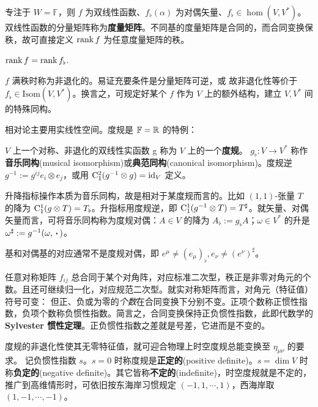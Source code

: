 专注于 $W=\mathbb F$，则 $f$ 为双线性函数、$f_\flat(\alpha)$ 为对偶矢量、$f_\flat\in\hom(V,V^*)$。
双线性函数的分量矩阵称为\textbf{度量矩阵}。不同基的度量矩阵是合同的，而合同变换保秩，故可直接定义 $\rank f$ 为任意度量矩阵的秩。

\begin{theorem}
    $\rank f=\rank f_\flat$.
\end{theorem}

$f$ 满秩时称为非退化的。易证充要条件是分量矩阵可逆，或
故非退化性等价于 $f_\flat\in\mathrm{Isom}(V,V^*)$。换言之，可规定好某个 $f$ 作为 $V$ 上的额外结构，建立 $V,V^*$ 间的特殊同构。

相对论主要用实线性空间。度规是 $\mathbb F=\mathbb{R}$ 的特例：

\begin{definition}
    $V$ 上一个对称、非退化的双线性实函数 g 称为 $V$ 上的一个\textbf{度规}。 $g_\flat:V\to V^*$ 称作\textbf{音乐同构}(musical isomorphism)或\textbf{典范同构}(canonical isomorphism)。度规逆 $g^{-1}:=g^{ij} e_i\otimes e_j$，或用 $\mathrm{C}^2_1(g^{-1}\otimes g)=\mathrm{id}_V$ 定义。
\end{definition}

\begin{definition}
    升降指标操作本质为音乐同构，故是相对于某度规而言的。比如 $(1,1)$-张量 $T$ 的降为
    $\mathrm{C}_1^1(g\otimes T)=T_\flat$。升指标用度规逆，即 $\mathrm{C}_1^1(g^{-1}\otimes T)=T^\sharp$。就矢量、对偶矢量而言，可将音乐同构称为度规对偶：$A\in V$ 的降为 $A_\flat:=g_\flat A$；$\omega\in V^*$ 的升是 $\omega^\sharp:=g^{-1}(\omega,\oo)$。
\end{definition}

\begin{remark}
    基和对偶基的对应通常不是度规对偶，即 $e^\mu\ne (e_\mu)_\flat, e_\nu\ne (e^\nu)^\sharp$。
\end{remark}

任意对称矩阵 $f_{ij}$ 总合同于某个对角阵，对应标准二次型，秩正是非零对角元的个数。且还可继续归一化，对应规范二次型。就实对称矩阵而言，对角元（特征值）符号可变：
但正、负或为零的\textit{个数}在合同变换下分别不变。正项个数称正惯性指数，负项个数称负惯性指数。简言之，合同变换保持正负惯性指数，此即代数学的 \textbf{Sylvester 惯性定理}。正负惯性指数之差就是号差，它进而是不变的。

度规的非退化性使其无零特征值，就可迎合物理上时空度规总能变换至 $\eta_{\mu\nu}$ 的要求。
记负惯性指数 $s$。$s=0$ 时称度规是\textbf{正定的}(positive definite)。$s=\dim V$ 时称\textbf{负定的}(negative definite)。其它皆称\textbf{不定的}(indefinite)，时空度规就是不定的，推广到高维情形时，可依旧按东海岸习惯规定 $(-1,1,\cdots,1)$，西海岸取 $(1,-1,\cdots,-1)$。

